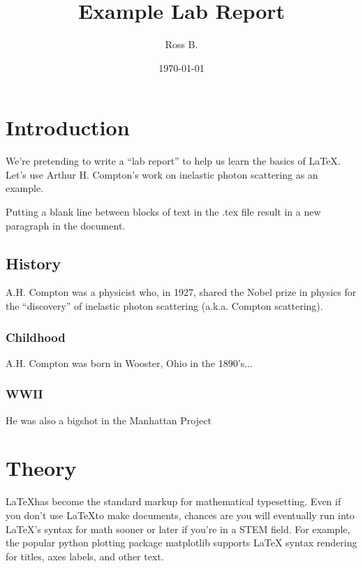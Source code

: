 \documentclass[11pt]{article}
\title{Example Lab Report}
\author{Ross B.}
\date{\today}
\begin{document}
\maketitle

\section{Introduction}
We're pretending to write a ``lab report'' to help us learn the basics of
\LaTeX. %
Let's use Arthur H. Compton's work on inelastic photon scattering as an 
example.

Putting a blank line between blocks of text in the .tex file result in a new
paragraph in the document.

\subsection{History}
\label{sec:nobel}
A.H. Compton was a physicist who, in 1927, shared the Nobel prize in physics 
for the ``discovery'' of inelastic photon scattering (a.k.a. Compton
scattering).

\subsubsection*{Childhood}
A.H. Compton was born in Wooster, Ohio in the 1890's... 
\subsubsection*{WWII}
He was also a bigshot in the Manhattan Project


\section{Theory}
\label{sec:theory}

\LaTeX has become the standard markup for mathematical typesetting. 
Even if you don't use \LaTeX to make documents, chances are you will eventually
run into \LaTeX's syntax for math sooner or later if you're in a STEM field.
For example, the popular python plotting package matplotlib supports \LaTeX
syntax rendering for titles, axes labels, and other text.
\end{document}
